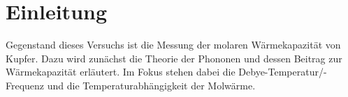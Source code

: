 \section{Einleitung}
Gegenstand dieses Versuchs ist die Messung der molaren Wärmekapazität von Kupfer. Dazu wird zunächst die Theorie der Phononen und dessen Beitrag zur Wärmekapazität erläutert. Im Fokus stehen dabei die Debye-Temperatur/-Frequenz und die Temperaturabhängigkeit der Molwärme.